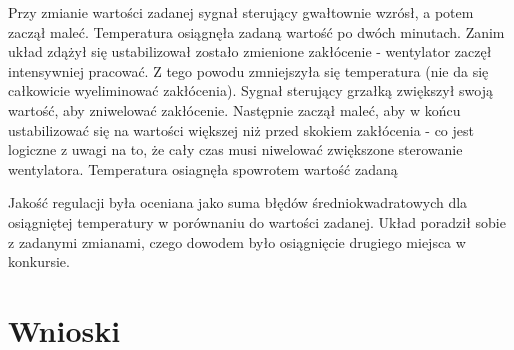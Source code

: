 \documentclass[12pt, a4paper]{article}
\begin{document}
Przy zmianie wartości zadanej sygnał sterujący gwałtownie wzrósł, a potem zaczął maleć. Temperatura osiągnęła zadaną wartość po dwóch minutach. Zanim układ zdążył się ustabilizował zostało zmienione zakłócenie - wentylator zaczęł intensywniej pracować. Z tego powodu zmniejszyła się temperatura (nie da się całkowicie wyeliminować zakłócenia). Sygnał sterujący grzałką zwiększył swoją wartość, aby zniwelować zakłócenie. Następnie zaczął maleć, aby w końcu ustabilizować się na wartości większej niż przed skokiem zakłócenia - co jest logiczne z uwagi na to, że cały czas musi niwelować zwiększone sterowanie wentylatora. Temperatura osiagnęła spowrotem wartość zadaną

Jakość regulacji była oceniana jako suma błędów średniokwadratowych dla osiągniętej temperatury w porównaniu do wartości zadanej. Układ poradził sobie z zadanymi zmianami, czego dowodem było osiągnięcie drugiego miejsca w konkursie. 

\section{Wnioski}
\end{document}
